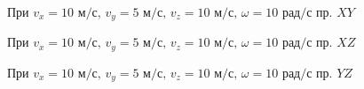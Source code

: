 \documentclass[a5paper, 10pt]{article}
\theoremstyle{definition}
\theoremstyle{plain}
\theoremstyle{remark}
\begin{document}
\newpage
\begin{figure}[!h]
	           \caption{При $v_x = 10 \text{ м/с}, \, v_y = 5  \text{ м/с}, \, v_z = 10  \text{ м/с}, \, \omega = 10 \text{ рад/с}$ пр. $XY$}
\end{figure}

\begin{figure}[h]
	           \caption{При $v_x = 10 \text{ м/с}, \, v_y = 5  \text{ м/с}, \, v_z = 10  \text{ м/с}, \, \omega = 10 \text{ рад/с}$ пр. $XZ$}
\end{figure}

\begin{figure}[h]
	           \caption{При $v_x = 10 \text{ м/с}, \, v_y = 5  \text{ м/с}, \, v_z = 10  \text{ м/с}, \, \omega = 10 \text{ рад/с}$ пр. $YZ$}
\end{figure}
\end{document}
